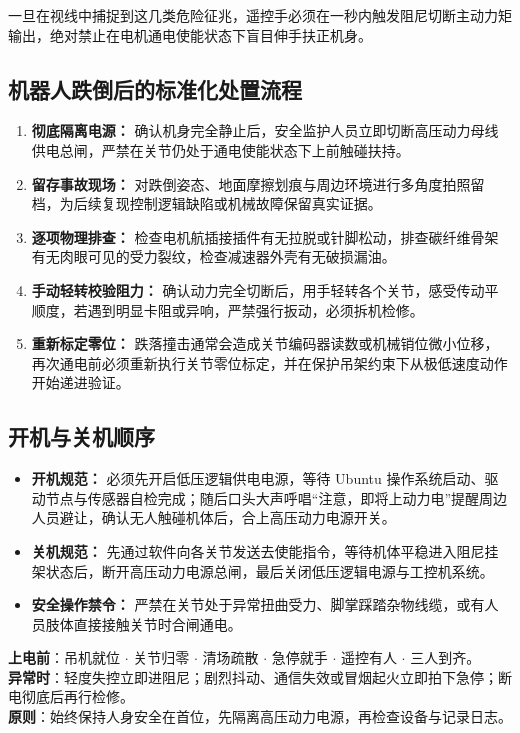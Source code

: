 一旦在视线中捕捉到这几类危险征兆，遥控手必须在一秒内触发阻尼切断主动力矩输出，绝对禁止在电机通电使能状态下盲目伸手扶正机身。

\subsection{机器人跌倒后的标准化处置流程}

\begin{enumerate}[leftmargin=*]
    \item \textbf{彻底隔离电源：} 确认机身完全静止后，安全监护人员立即切断高压动力母线供电总闸，严禁在关节仍处于通电使能状态下上前触碰扶持。
    \item \textbf{留存事故现场：} 对跌倒姿态、地面摩擦划痕与周边环境进行多角度拍照留档，为后续复现控制逻辑缺陷或机械故障保留真实证据。
    \item \textbf{逐项物理排查：} 检查电机航插接插件有无拉脱或针脚松动，排查碳纤维骨架有无肉眼可见的受力裂纹，检查减速器外壳有无破损漏油。
    \item \textbf{手动轻转校验阻力：} 确认动力完全切断后，用手轻转各个关节，感受传动平顺度，若遇到明显卡阻或异响，严禁强行扳动，必须拆机检修。
    \item \textbf{重新标定零位：} 跌落撞击通常会造成关节编码器读数或机械销位微小位移，再次通电前必须重新执行关节零位标定，并在保护吊架约束下从极低速度动作开始递进验证。
\end{enumerate}

\subsection{开机与关机顺序}

\begin{itemize}[leftmargin=*]
    \item \textbf{开机规范：} 必须先开启低压逻辑供电电源，等待 Ubuntu 操作系统启动、驱动节点与传感器自检完成；随后口头大声呼唱“注意，即将上动力电”提醒周边人员避让，确认无人触碰机体后，合上高压动力电源开关。
    \item \textbf{关机规范：} 先通过软件向各关节发送去使能指令，等待机体平稳进入阻尼挂架状态后，断开高压动力电源总闸，最后关闭低压逻辑电源与工控机系统。
    \item \textbf{安全操作禁令：} 严禁在关节处于异常扭曲受力、脚掌踩踏杂物线缆，或有人员肢体直接接触关节时合闸通电。
\end{itemize}

\begin{dangerbox}[实验室工位安全准则]
\textbf{上电前}：吊机就位 $\cdot$ 关节归零 $\cdot$ 清场疏散 $\cdot$ 急停就手 $\cdot$ 遥控有人 $\cdot$ 三人到齐。\\
\textbf{异常时}：轻度失控立即进阻尼；剧烈抖动、通信失效或冒烟起火立即拍下急停；断电彻底后再行检修。\\
\textbf{原则}：始终保持人身安全在首位，先隔离高压动力电源，再检查设备与记录日志。
\end{dangerbox}

\newpage